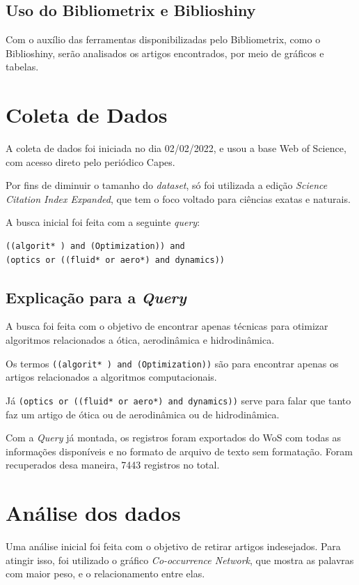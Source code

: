 \subsection{Uso do Bibliometrix e Biblioshiny}
     Com o auxílio das ferramentas disponibilizadas pelo Bibliometrix, como o Biblioshiny, serão analisados os artigos encontrados, por meio de gráficos e tabelas.   
\section{Coleta de Dados}
    A coleta de dados foi iniciada no dia 02/02/2022, e usou a base Web of Science, com acesso direto pelo periódico Capes.
    
    Por fins de diminuir o tamanho do \emph{dataset}, só foi utilizada a edição \emph{Science Citation Index Expanded}, que tem o foco voltado para ciências exatas e naturais.
    
    A busca inicial foi feita com a seguinte \emph{query}:
\begin{lstlisting}[basicstyle = \normalsize]
((algorit* ) and (Optimization)) and 
(optics or ((fluid* or aero*) and dynamics))
\end{lstlisting}
\subsection{Explicação para a \emph{Query}}
    A busca foi feita com o objetivo de encontrar apenas técnicas para otimizar algoritmos relacionados a ótica, aerodinâmica e hidrodinâmica.
    
    Os termos \verb|((algorit* ) and (Optimization))| são para encontrar apenas os artigos relacionados a algoritmos computacionais.
    
    Já \verb|(optics or ((fluid* or aero*) and dynamics))| serve para falar que tanto faz um artigo de ótica ou de aerodinâmica ou de hidrodinâmica.
    
    Com a \emph{Query} já montada, os registros foram exportados do WoS com todas as informações disponíveis e no formato de arquivo de texto sem formatação. Foram recuperados desa maneira, 7443 registros no total.
\section{Análise dos dados}
    Uma análise inicial foi feita com o objetivo de retirar artigos indesejados. Para atingir isso, foi utilizado o gráfico \emph{Co-occurrence Network}, que mostra as palavras com maior peso, e o relacionamento entre elas.
    
